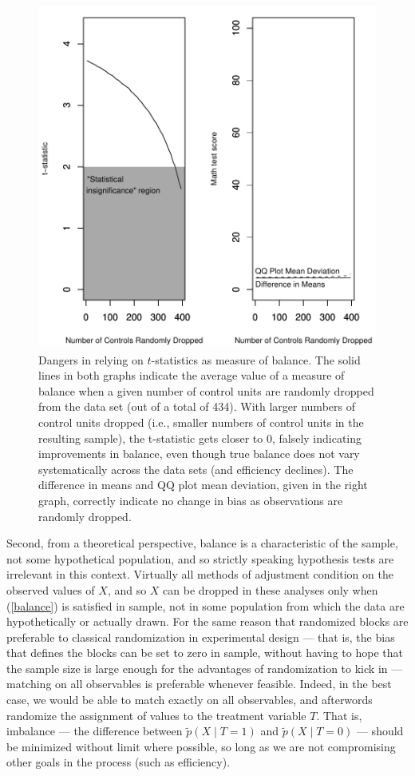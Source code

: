 \documentclass[11pt,titlepage]{article}
\begin{document}
\begin{figure}[t]
  \centering
  \includegraphics[height=4.5in]{figs/TStatPlotR0MATH}
  \caption{Dangers in relying on $t$-statistics as measure of balance.
    The solid lines in both graphs indicate the average value of a
    measure of balance when a given number of control units are
    randomly dropped from the data set (out of a total of 434).  With
    larger numbers of control units dropped (i.e., smaller numbers of
    control units in the resulting sample), the t-statistic gets
    closer to 0, falsely indicating improvements in balance, even
    though true balance does not vary systematically across the data
    sets (and efficiency declines).  The difference in means and QQ
    plot mean deviation, given in the right graph, correctly indicate
    no change in bias as observations are randomly dropped.}
  \label{f:randrop}
\end{figure}

Second, from a theoretical perspective, balance is a characteristic of
the sample, not some hypothetical population, and so strictly speaking
hypothesis tests are irrelevant in this context.  Virtually all
methods of adjustment condition on the observed values of $X$, and so
$X$ can be dropped in these analyses only when (\ref{balance}) is
satisfied in sample, not in some population from which the data are
hypothetically or actually drawn.  For the same reason that randomized
blocks are preferable to classical randomization in experimental
design --- that is, the bias that defines the blocks can be set to
zero in sample, without having to hope that the sample size is large
enough for the advantages of randomization to kick in --- matching on
all observables is preferable whenever feasible.  Indeed, in the best
case, we would be able to match exactly on all observables, and
afterwords randomize the assignment of values to the treatment
variable $T$.  That is, imbalance --- the difference between $\tilde
p(X\mid T=1)$ and $\tilde p(X\mid T=0)$ --- should be minimized
without limit where possible, so long as we are not compromising other
goals in the process (such as efficiency).
\end{document}
